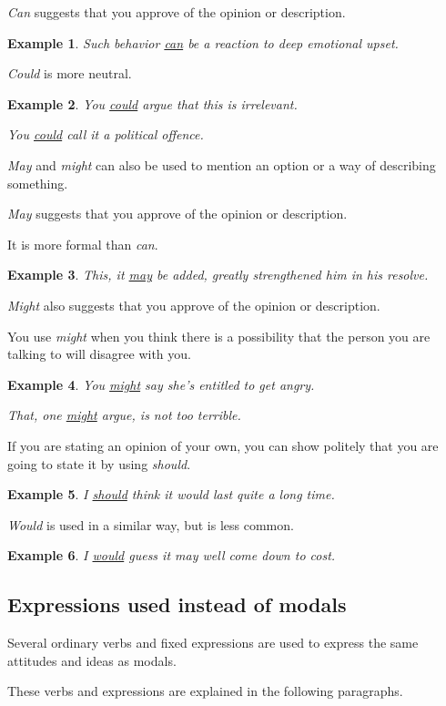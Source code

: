 \documentclass[oneside]{book}
\numberwithin{equation}{section}
\newtheorem{example}{Example}[section]
\begin{document}
%
\textit{Can} suggests that you approve of the opinion or description.
\begin{example}
    Such behavior \underline{can} be a reaction to deep emotional upset.
\end{example}
\textit{Could} is more neutral.
\begin{example}
    You \underline{could} argue that this is irrelevant.
    
    You \underline{could} call it a political offence.
\end{example}
%
\noindent{} \textit{May} and \textit{might} can also be used to mention an option or a way of describing something.

%
\textit{May} suggests that you approve of the opinion or description.

It is more formal than \textit{can}.
\begin{example}
    This, it \underline{may} be added, greatly strengthened him in his resolve.
\end{example}
\textit{Might} also suggests that you approve of the opinion or description.

You use \textit{might} when you think there is a possibility that the person you are talking to will disagree with you.
\begin{example}
    You \underline{might} say she's entitled to get angry.
    
    That, one \underline{might} argue, is not too terrible.
\end{example}
%
\noindent{} If you are stating an opinion of your own, you can show politely that you are going to state it by using \textit{should}.
\begin{example}
    I \underline{should} think it would last quite a long time.
\end{example}
\textit{Would} is used in a similar way, but is less common.
\begin{example}
    I \underline{would} guess it may well come down to cost.
\end{example}

\subsection{Expressions used instead of modals}
\noindent{} Several ordinary verbs and fixed expressions are used to express the same attitudes and ideas as modals.

These verbs and expressions are explained in the following paragraphs.
\end{document}
